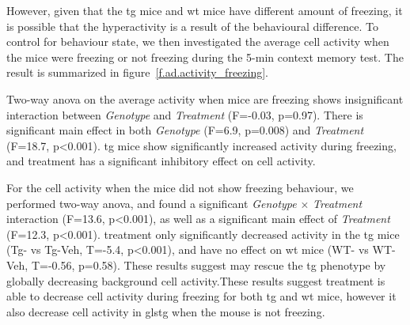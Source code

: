 However, given that the \gls{tg} mice and \gls{wt} mice have different amount of freezing, it is possible that the hyperactivity is a result of the behavioural difference. To control for behaviour state, we then investigated the average cell activity when the mice were freezing or not freezing during the 5-min context memory test. The result is summarized in figure~\ref{f.ad.activity_freezing}.  

Two-way \gls{anova} on the average activity when mice are freezing shows insignificant interaction between \textit{Genotype} and \textit{Treatment} (F=-0.03, p=0.97). There is significant main effect in both \textit{Genotype} (F=6.9, p=0.008) and \textit{Treatment} (F=18.7, p<0.001). \Gls{tg} mice show significantly increased activity during freezing, and \tglu{} treatment has a significant inhibitory effect on cell activity. 

For the cell activity when the mice did not show freezing behaviour, we performed two-way \gls{anova}, and found a significant \textit{Genotype} $\times$ \textit{Treatment} interaction (F=13.6, p<0.001), as well as a significant main effect of \textit{Treatment} (F=12.3, p<0.001). \tglu{} treatment only significantly decreased activity in the \gls{tg} mice (Tg-\glu{} vs Tg-Veh, T=-5.4, p<0.001), and have no effect on \gls{wt} mice (WT-\glu{} vs WT-Veh, T=-0.56, p=0.58). These results suggest \tglu{} may rescue the \gls{tg} phenotype by globally decreasing background cell activity.These results suggest \tglu{} treatment is able to decrease cell activity during freezing for both \gls{tg} and \gls{wt} mice, however it also decrease cell activity in gls{tg} when the mouse is not freezing.


